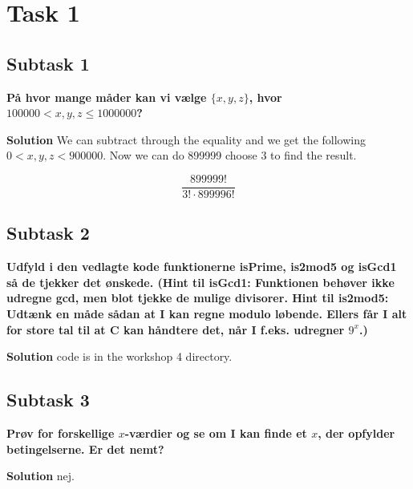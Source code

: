 
\section{Task 1}
\subsection{Subtask 1}
\noindent
\textbf{På hvor mange måder kan vi vælge $\{x,y,z\}$, hvor $100000<x,y,z\leq 1000000$?}

\bigskip
\noindent
\textbf{Solution}
We can subtract through the equality and we get the following $0<x,y,z<900000$. Now we can do 899999 choose 3 to find the result.

\begin{equation}
    \frac{899999!}{3!\cdot899996!}
\end{equation}

\subsection{Subtask 2}
\noindent
\textbf{Udfyld i den vedlagte kode funktionerne isPrime, is2mod5 og isGcd1 så de tjekker det ønskede. (Hint til isGcd1: Funktionen behøver ikke udregne gcd, men blot tjekke de mulige divisorer. Hint til is2mod5: Udtænk en måde sådan at I kan regne modulo løbende. Ellers får I alt for store tal til at C kan håndtere det, når I f.eks. udregner $9^x$.)}

\bigskip
\noindent
\textbf{Solution}
code is in the workshop 4 directory.

\subsection{Subtask 3}
\noindent
\textbf{Prøv for forskellige $x$-værdier og se om I kan finde et $x$, der opfylder betingelserne. Er det nemt?}

\bigskip
\noindent
\textbf{Solution}
nej.
